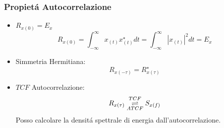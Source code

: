         \subsubsection{Propietá Autocorrelazione}
            \begin{itemize}
                \item {$R_{x(0)} = E_x$
                    \[
                        R_{x(0)} =\int_{-\infty}^{\infty}x_{(t)}x_{(t)}^\star dt =\int_{-\infty}^{\infty}|x_{(t)}|^2 dt = E_x   
                    \]
                }
                \item {Simmetria Hermitiana:
                    \[
                        R_{x(-\tau)} =R_{x(\tau)}^\star 
                    \]
                }
                \item {$TCF$ Autocorrelazione:
                    \[ 
                        R_{x(\tau)} \overunderset{TCF}{ATCF}{\rightleftharpoons} S_{x(f)}
                    \]
                    Posso calcolare la densitá spettrale di energia dall'autocorrelazione.
                }
            \end{itemize}
